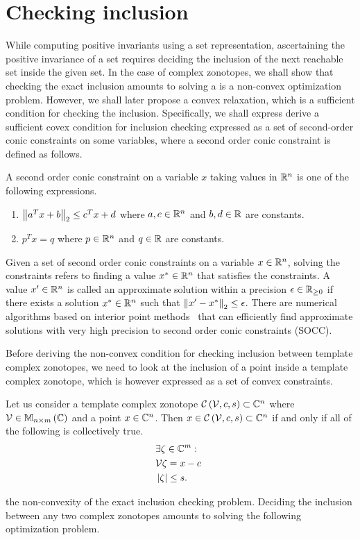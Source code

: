 \section{Checking inclusion}
While computing positive invariants using a set representation,
ascertaining the positive invariance of a set requires deciding the
inclusion of the next reachable set inside the given set.  In the case
of complex zonotopes, we shall show that checking the exact inclusion
amounts to solving a is a non-convex optimization problem.  However,
we shall later propose a convex relaxation, which is a sufficient
condition for checking the inclusion.  Specifically, we shall express
derive a sufficient covex condition for inclusion checking expressed
as a set of second-order conic constraints on some variables, where a
second order conic constraint is defined as follows.
%
\begin{definition}
A second order conic constraint on a variable $x$ taking values in
$\mathbb{R}^n$ is one of the following expressions.
\begin{enumerate}
\item  $\left\|a^Tx+b\right\|_{2}\leq c^Tx+d$ where $a,c\in\mathbb{R}^n$ and
$b,d\in\mathbb{R}$ are constants.
\item $p^Tx=q$ where $p\in\mathbb{R}^n$ and $q\in\mathbb{R}$ are constants.
\end{enumerate}
\end{definition}
%
Given a set of second order conic constraints on a variable
$x\in\mathbb{R}^n$, solving the constraints refers to finding a value
$x^*\in\mathbb{R}^n$ that satisfies the constraints.  A value
$x^\prime\in\mathbb{R}^n$ is called an approximate solution within a
precision $\epsilon\in\mathbb{R}_{\geq 0}$ if there exists a solution
$x^*\in\mathbb{R}^n$ such that $\left\|x^\prime-x^*\right\|_{2}\leq \epsilon$.  There
are numerical algorithms based on interior point methods~\cite{todo}
that can efficiently find approximate solutions with very high
precision to second order conic constraints (SOCC).

Before deriving the non-convex condition for checking inclusion
between template complex zonotopes, we need to look at the inclusion
of a point inside a template complex zonotope, which is however
expressed as a set of convex constraints.
%
\begin{lemma}
Let us consider a template complex zonotope
$\mathit{\mathcal{C}}\left(\mathcal{V},c,s\right)\subset\mathbb{C}^n$ where
$\mathcal{V}\in\mathbb{M}_{n\times m}\left(\mathbb{C}\right)$ and a point $x\in\mathbb{C}^n$.  Then
$x\in\mathit{\mathcal{C}}\left(\mathcal{V},c,s\right)\subset\mathbb{C}^n$ if and only if
all of the following is collectively true.
%
\begin{align}
& \exists\zeta\in\mathbb{C}^m:\nonumber\\
& \mathcal{V}\zeta = x-c~\label{eqn:lem-point-inclusion-1}\\
& \left|\zeta\right|\leq s.~\label{eqn:lem-point-inclusion-2}
\end{align}
%
\end{lemma}
%
the non-convexity of the exact inclusion checking problem.  Deciding
the inclusion between any two complex zonotopes amounts to solving the
following optimization problem.


